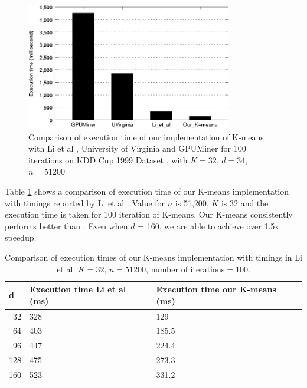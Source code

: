 \begin{figure}[h]
	\centerline{
   \includegraphics[width=0.8\textwidth]{./Data/comparison/kddPublished}  	
	}
	\caption{ Comparison of execution time of our implementation of K-means with Li et al \cite{li_et_al}, University of Virginia \cite{che_et_al} and GPUMiner \cite{gpuminer} for 100 iterations on KDD Cup 1999 Dataset \cite{kdd}, with $K = 32$, $d = 34$, $n = 51200$}
\label{fig:kddpub}
\end{figure}


Table \ref{table:liComp} shows a comparison of execution time of our K-means implementation with timings reported by Li et al \cite{li_et_al}. Value for $n$ is 51,200, $K$ is 32 and the execution time is taken for 100 iteration of K-means. Our K-means consistently performs better than \cite{li_et_al}. Even when $d$ = 160, we are able to achieve over 1.5x speedup.

\begin{table}[h]
\begin{center}
\begin{tabular}{|r|p{3.5cm}|p{3.5cm}|}
\hline
\multicolumn{1}{|l|}{d} & \multicolumn{1}{p{3.5cm}|}{Execution time Li et al\cite{li_et_al} (ms)} & \multicolumn{1}{p{3.5cm}|}{Execution time our K-means (ms)} \\ \hline
32 & 328 & 129 \\ \hline
64 & 403 & 185.5 \\ \hline
96 & 447 & 224.4 \\ \hline
128 & 475 & 273.3 \\ \hline
160 & 523 & 331.2 \\ \hline
\end{tabular}
\end{center}
\caption{Comparison of execution times of our K-means implementation with timings in Li et al\cite{li_et_al}. $K = 32$, $n = 51200$, number of iterations$ = 100$.}
\label{table:liComp}
\end{table}


